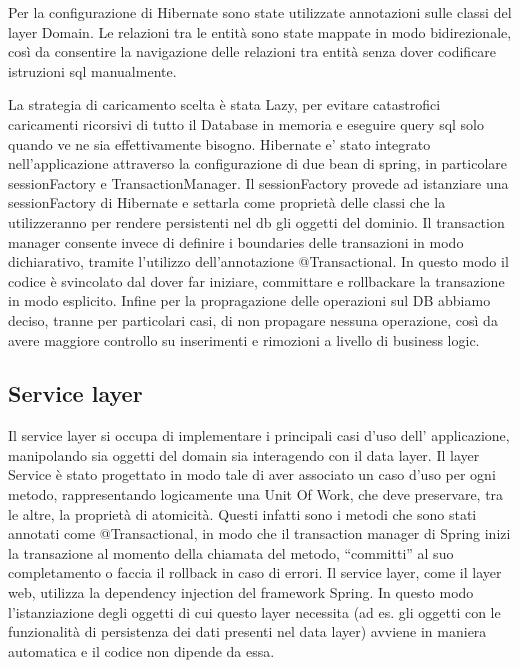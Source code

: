 Per la configurazione di Hibernate sono state utilizzate
annotazioni sulle classi del layer Domain.  Le relazioni tra le entità
sono state mappate in modo bidirezionale, così da consentire la
navigazione delle relazioni tra entità senza dover codificare
istruzioni sql manualmente. 

La strategia di caricamento scelta è stata Lazy, per evitare
catastrofici caricamenti ricorsivi di tutto il Database in memoria e
eseguire query sql solo quando ve ne sia effettivamente bisogno.
Hibernate e' stato integrato nell'applicazione attraverso la
configurazione di due bean di spring, in particolare sessionFactory e
TransactionManager. Il sessionFactory provede ad istanziare una
sessionFactory di Hibernate e settarla come proprietà delle classi che
la utilizzeranno per rendere persistenti nel db gli oggetti del
dominio. Il transaction manager consente invece di definire i
boundaries delle transazioni in modo dichiarativo, tramite l'utilizzo
dell'annotazione @Transactional.  In questo modo il codice è
svincolato dal dover far iniziare, committare e rollbackare la
transazione in modo esplicito. Infine per la propragazione delle operazioni sul DB abbiamo
deciso, tranne per particolari casi, di non propagare nessuna
operazione, così da avere maggiore controllo su inserimenti e
rimozioni a livello di business logic.


\subsection{Service layer}

Il service layer si occupa di implementare i principali casi d'uso
dell' applicazione, manipolando sia oggetti del domain sia interagendo
con il data layer.  Il layer Service è stato progettato in modo tale
di aver associato un caso d'uso per ogni metodo, rappresentando
logicamente una Unit Of Work, che deve preservare, tra le altre, la
proprietà di atomicità. Questi infatti sono i metodi che sono stati
annotati come @Transactional, in modo che il transaction manager di
Spring inizi la transazione al momento della chiamata del metodo,
``committi'' al suo completamento o faccia il rollback in caso di errori.
Il service layer, come il layer web, utilizza la dependency injection
del framework Spring. In questo modo l'istanziazione degli oggetti di
cui questo layer necessita (ad es. gli oggetti con le funzionalità di
persistenza dei dati presenti nel data layer) avviene in maniera
automatica e il codice non dipende da essa.

